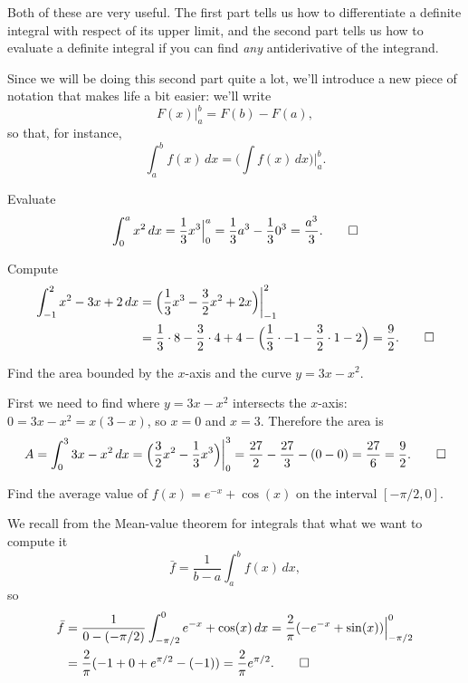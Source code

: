 \noindent
Both of these are very useful. The first part tells us how to differentiate a definite integral with respect of its upper limit, and the second part tells us how to evaluate a definite integral if you can find \emph{any} antiderivative of the integrand.

Since we will be doing this second part quite a lot, we'll introduce a new piece of notation that makes life a bit easier: we'll write
\[
	F(x) \Big \rvert_a^b = F(b) - F(a),
\]
so that, for instance,
\[
	\int_a^b f(x) \, d x = \Big ( \int f(x) \, d x \Big ) \biggr \rvert_a^b.
\]

\begin{example}
	Evaluate
	\[
		\int_0^a x^2 \, d x = \frac{1}{3} x^3 \Big \rvert_0^a = \frac{1}{3} a^3 - \frac{1}{3} 0^3 = \frac{a^3}{3}. \qedhere
	\]
\end{example}

\begin{example}
	Compute
	\begin{align*}
		\int_{-1}^2 x^2 - 3 x + 2 \, d x & = \Big ( \frac{1}{3} x^3 - \frac{3}{2} x^2 + 2 x \Big ) \biggr \rvert_{-1}^2                                                           \\
		                                 & = \frac{1}{3} \cdot 8 - \frac{3}{2} \cdot 4 + 4 - \Big ( \frac{1}{3} \cdot -1 - \frac{3}{2} \cdot 1 - 2 \Big ) = \frac{9}{2}. \qedhere
	\end{align*}
\end{example}

\begin{example}
	Find the area bounded by the $x$-axis and the curve $y = 3x - x^2$.

	First we need to find where $y = 3x - x^2$ intersects the $x$-axis: $0 = 3 x - x^2 = x (3 - x)$, so $x = 0$ and $x = 3$. Therefore the area is
	\[
		A = \int_0^3 3 x - x^2 \, d x = \Big ( \frac{3}{2} x^2 - \frac{1}{3} x^3 \Big ) \biggr \rvert_0^3 = \frac{27}{2} - \frac{27}{3} - (0 - 0) = \frac{27}{6} = \frac{9}{2}. \qedhere
	\]
\end{example}

\begin{example}
	Find the average value of $f(x) = e^{-x} + \cos(x)$ on the interval $[{-\pi/2}, 0]$.

	We recall from the Mean-value theorem for integrals that what we want to compute it
	\[
		\bar{f} = \frac{1}{b - a} \int_a^b f(x) \, d x,
	\]
	so
	\begin{align*}
		\bar{f} & = \frac{1}{0 - (- \pi/2)} \int_{-\pi/2}^0 e^{-x} + \cos(x) \, d x = \frac{2}{\pi} (-e^{-x} + \sin(x)) \Big \rvert_{-\pi/2}^0 \\
		        & = \frac{2}{\pi} (-1 + 0 + e^{\pi/2} - (-1)) = \frac{2}{\pi} e^{\pi/2}. \qedhere
	\end{align*}
\end{example}

